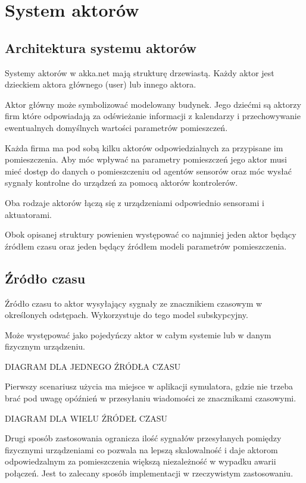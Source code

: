 \chapter{System aktorów}\label{ch:aktorzy}
\section{Architektura systemu aktorów}
Systemy aktorów w akka.net mają strukturę drzewiastą. 
Każdy aktor jest dzieckiem aktora głównego (user) lub innego aktora. 



Aktor główny może symbolizować modelowany budynek.
Jego dziećmi są aktorzy firm które odpowiadają za odświeżanie informacji z kalendarzy i przechowywanie ewentualnych domyślnych wartości parametrów pomieszczeń.

Każda firma ma pod sobą kilku aktorów odpowiedzialnych za przypisane im pomieszczenia.
Aby móc wpływać na parametry pomieszczeń jego aktor musi mieć dostęp do danych o pomieszczeniu od agentów sensorów oraz móc wysłać sygnały kontrolne do urządzeń za pomocą aktorów kontrolerów.

Oba rodzaje aktorów łączą się z urządzeniami odpowiednio sensorami i aktuatorami.

Obok opisanej struktury powienien występować co najmniej jeden aktor będący źródłem czasu oraz jeden będący źródłem modeli parametrów pomieszczenia.

\section{Źródło czasu}
Źródło czasu to aktor wysyłający sygnały ze znacznikiem czasowym w określonych odstępach. Wykorzystuje do tego model subskypcyjny.

Może występować jako pojedyńczy aktor w całym systemie lub w danym fizycznym urządzeniu. 

DIAGRAM DLA JEDNEGO ŹRÓDŁA CZASU
% 

Pierwszy scenariusz użycia ma miejsce w aplikacji symulatora, gdzie nie trzeba brać pod uwagę opóźnień w przesyłaniu wiadomości ze znacznikami czasowymi.

DIAGRAM DLA WIELU ŹRÓDEŁ CZASU
% 

Drugi sposób zastosowania ogranicza ilość sygnałów przesyłanych pomiędzy fizycznymi urządzeniami co pozwala na lepszą skalowalność i daje aktorom odpowiedzalnym za pomieszczenia większą niezależność w wypadku awarii połączeń.
Jest to zalecany sposób implementacji w rzeczywistym zastosowaniu.

